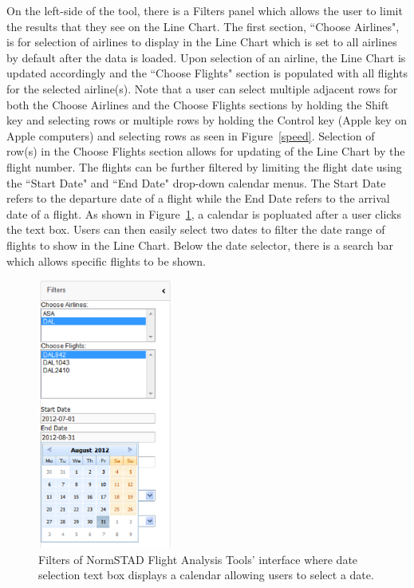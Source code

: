 \documentclass{sig-alternate}
\begin{document}
On the left-side of the tool, there is a Filters panel which allows the user
to limit the results that they see on the Line Chart. The first section,
``Choose Airlines", is for selection of airlines to display in the 
Line Chart which is set to all airlines by default after the data is loaded.
Upon selection of an airline, the Line Chart is updated accordingly and 
the ``Choose Flights" section is populated with all flights
for the selected airline(s). Note that a user can select
multiple adjacent rows for both the Choose Airlines and the Choose Flights
sections by holding the Shift key and selecting rows or multiple rows
by holding the Control key (Apple key on Apple computers) and selecting rows as 
seen in Figure~\ref{speed}.
Selection of row(s) in the Choose Flights section allows for updating 
of the Line Chart by the flight number. The flights can be further filtered 
by limiting the flight date using the ``Start Date" and ``End Date" drop-down 
calendar menus. The Start Date refers to the departure date of a flight
while the End Date refers to the arrival date of a flight. As shown in
Figure~\ref{calendar}, a calendar is popluated after a user clicks the text box.
Users can then easily select two dates to filter the date range of flights 
to show in the Line Chart. Below the date selector, there is a search bar which 
allows specific flights to be shown.


\begin{figure}
\centering
\includegraphics[height=3.5in]{figs/calendar.eps}
\caption{
	Filters of NormSTAD Flight Analysis Tools' interface where date selection text box
displays a calendar allowing users to select a date.
}
\label{calendar}
\end{figure}
\end{document}
